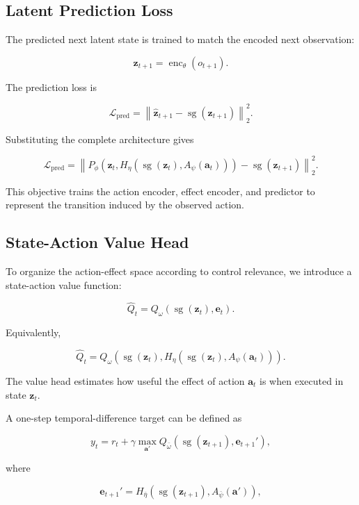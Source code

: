 ﻿\documentclass{article}
\begin{document}
\subsection{Latent Prediction Loss}

The predicted next latent state is trained to match the encoded next
observation:

\[
\mathbf{z}_{t+1}
=
\operatorname{enc}_{\theta}(o_{t+1}).
\]

The prediction loss is

\[
\mathcal{L}_{\mathrm{pred}}
=
\left\|
\hat{\mathbf{z}}_{t+1}
-
\operatorname{sg}(\mathbf{z}_{t+1})
\right\|_2^2.
\]

Substituting the complete architecture gives

\[
\mathcal{L}_{\mathrm{pred}}
=
\left\|
P_{\phi}
\left(
\mathbf{z}_t,
H_{\eta}
\left(
\operatorname{sg}(\mathbf{z}_t),
A_{\psi}(\mathbf{a}_t)
\right)
\right)
-
\operatorname{sg}(\mathbf{z}_{t+1})
\right\|_2^2.
\]

This objective trains the action encoder, effect encoder, and predictor
to represent the transition induced by the observed action.

\subsection{State-Action Value Head}

To organize the action-effect space according to control relevance, we
introduce a state-action value function:

\[
\hat{Q}_t
=
Q_{\omega}
\left(
\operatorname{sg}(\mathbf{z}_t),
\mathbf{e}_t
\right).
\]

Equivalently,

\[
\hat{Q}_t
=
Q_{\omega}
\left(
\operatorname{sg}(\mathbf{z}_t),
H_{\eta}
\left(
\operatorname{sg}(\mathbf{z}_t),
A_{\psi}(\mathbf{a}_t)
\right)
\right).
\]

The value head estimates how useful the effect of action
\(\mathbf{a}_t\) is when executed in state \(\mathbf{z}_t\).

A one-step temporal-difference target can be defined as

\[
y_t
=
r_t
+
\gamma
\max_{\mathbf{a}'}
Q_{\bar{\omega}}
\left(
\operatorname{sg}(\mathbf{z}_{t+1}),
\mathbf{e}_{t+1}'
\right),
\]

where

\[
\mathbf{e}_{t+1}'
=
H_{\bar{\eta}}
\left(
\operatorname{sg}(\mathbf{z}_{t+1}),
A_{\bar{\psi}}(\mathbf{a}')
\right),
\]
\end{document}
